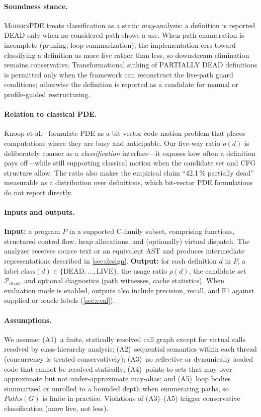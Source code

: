 \documentclass[acmsmall,screen,review,anonymous]{acmart}
\begin{document}
\paragraph{Soundness stance.}
\textsc{ModernPDE} treats classification as a static \emph{may}-analysis: a definition is reported DEAD only when no considered path shows a use. When path enumeration is incomplete (pruning, loop summarization), the implementation errs toward classifying a definition as more live rather than less, so downstream elimination remains conservative. Transformational sinking of PARTIALLY DEAD definitions is permitted only when the framework can reconstruct the live-path guard conditions; otherwise the definition is reported as a candidate for manual or profile-guided restructuring.

\paragraph{Relation to classical PDE.}
Knoop et al.~\cite{knoop1994partial} formulate PDE as a bit-vector code-motion problem that places computations where they are busy and anticipable. Our five-way ratio $\rho(d)$ is deliberately coarser as a \emph{classification} interface---it exposes how often a definition pays off---while still supporting classical motion when the candidate set and CFG structure allow. The ratio also makes the empirical claim ``42.1\,\% partially dead'' measurable as a distribution over definitions, which bit-vector PDE formulations do not report directly.

\paragraph{Inputs and outputs.}
\textbf{Input:} a program $P$ in a supported C-family subset, comprising functions, structured control flow, heap allocations, and (optionally) virtual dispatch. The analyzer receives source text or an equivalent AST and produces intermediate representations described in \autoref{sec:design}.
\textbf{Output:} for each definition $d$ in $P$, a label $\mathrm{class}(d)\in\{\mathrm{DEAD},\ldots,\mathrm{LIVE}\}$, the usage ratio $\rho(d)$, the candidate set $\mathcal{P}_{dead}$, and optional diagnostics (path witnesses, cache statistics). When evaluation mode is enabled, outputs also include precision, recall, and F1 against supplied or oracle labels (\autoref{sec:eval}).

\paragraph{Assumptions.}
We assume: (A1)~a finite, statically resolved call graph except for virtual calls resolved by class-hierarchy analysis; (A2)~sequential semantics within each thread (concurrency is treated conservatively); (A3)~no reflective or dynamically loaded code that cannot be resolved statically; (A4)~points-to sets that may over-approximate but not under-approximate may-alias; and (A5)~loop bodies summarized or unrolled to a bounded depth when enumerating paths, so $\mathit{Paths}(G)$ is finite in practice. Violations of (A3)--(A5) trigger conservative classification (more live, not less).
\end{document}
